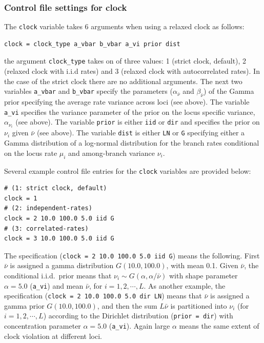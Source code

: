 \documentclass{book}
\numberwithin{equation}{section} \renewcommand{\baselinestretch}{0.55}
\begin{document}
\subsubsection{Control file settings for clock}
The \texttt{clock} variable takes 6 arguments when using a relaxed
clock as follows:
\begin{verbatim}
clock = clock_type a_vbar b_vbar a_vi prior dist
\end{verbatim}
the argument \texttt{clock\_type} takes on of three values: 1 (strict
clock, default), 2 (relaxed clock with i.i.d rates) and 3 (relaxed
clock with autocorrelated rates).  In the case of the strict clock
there are no additional arguments. The next two variables
\texttt{a\_vbar} and \texttt{b\_vbar} specify the parameters
($\alpha_{\bar{\nu}}$ and $\beta_{\bar{\nu}}$) of the Gamma prior
specifying the average rate variance across loci (see above).  The
variable \texttt{a\_vi} specifies the variance parameter of the prior
on the locus specific variance, $\alpha_{\nu_i}$ (see above). The
variable \texttt{prior} is either \texttt{iid} or \texttt{dir} and
specifies the prior on $\nu_i$ given $\bar{\nu}$ (see above). The
variable \texttt{dist} is either \texttt{LN} or \texttt{G} specifying
either a Gamma distribution of a log-normal distribution for the
branch rates conditional on the locus rate $\mu_i$ and among-branch
variance $\nu_i$.

Several example control file entries for the \texttt{clock} variables
are provided below:
\begin{verbatim}
# (1: strict clock, default)
clock = 1 
# (2: independent-rates)
clock = 2 10.0 100.0 5.0 iid G
# (3: correlated-rates)
clock = 3 10.0 100.0 5.0 iid G
\end{verbatim}
The specification (\texttt{clock = 2 10.0 100.0 5.0 iid G}) means the
following.  First $\bar\nu$ is assigned a gamma distribution
$G(10.0, 100.0)$, with mean 0.1.  Given $\bar\nu$, the conditional
i.i.d.\ prior means that $\nu_i \sim G(\alpha, \alpha/\bar\nu)$ with
shape parameter $\alpha = 5.0 $ (\texttt{a\_vi}) and mean $\bar\nu$,
for $i = 1, 2, \cdots, L$.  As another example, the specification
(\texttt{clock = 2 10.0 100.0 5.0 dir LN}) means that $\bar\nu$ is
assigned a gamma prior $G(10.0, 100.0)$, and then the sum $L\bar\nu$
is partitioned into $\nu_i$ (for $i = 1, 2, \cdots, L$) according to
the Dirichlet distribution (\texttt{prior = dir}) with concentration
parameter $\alpha = 5.0$ (\texttt{a\_vi}).  Again large $\alpha$ means
the same extent of clock violation at different loci.
\end{document}
